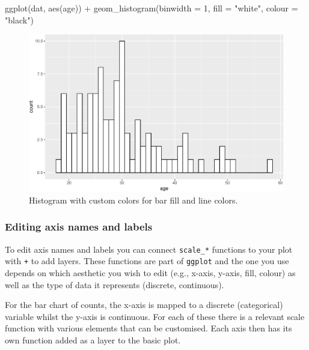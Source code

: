 \documentclass[
  english,
  doc,floatsintext]{apa6}
\newenvironment{Shaded}{\begin{snugshade}}{\end{snugshade}}
\newcommand{\AttributeTok}[1]{\textcolor[rgb]{0.77,0.63,0.00}{#1}}
\newcommand{\DecValTok}[1]{\textcolor[rgb]{0.00,0.00,0.81}{#1}}
\newcommand{\FunctionTok}[1]{\textcolor[rgb]{0.00,0.00,0.00}{#1}}
\newcommand{\NormalTok}[1]{#1}
\newcommand{\SpecialCharTok}[1]{\textcolor[rgb]{0.00,0.00,0.00}{#1}}
\newcommand{\StringTok}[1]{\textcolor[rgb]{0.31,0.60,0.02}{#1}}
\begin{document}
\begin{Shaded}
\begin{Highlighting}[]
\FunctionTok{ggplot}\NormalTok{(dat, }\FunctionTok{aes}\NormalTok{(age)) }\SpecialCharTok{+}
  \FunctionTok{geom\_histogram}\NormalTok{(}\AttributeTok{binwidth =} \DecValTok{1}\NormalTok{, }
                 \AttributeTok{fill =} \StringTok{"white"}\NormalTok{, }
                 \AttributeTok{colour =} \StringTok{"black"}\NormalTok{)}
\end{Highlighting}
\end{Shaded}

\begin{figure}

{\centering \includegraphics[width=1\linewidth]{images/histogram-fill-color-1} 

}

\caption{Histogram with custom colors for bar fill and line colors.}\label{fig:histogram-fill-color}
\end{figure}

\hypertarget{editing-axis-names-and-labels}{%
\subsubsection{Editing axis names and labels}\label{editing-axis-names-and-labels}}

To edit axis names and labels you can connect \texttt{scale\_*} functions to your plot with \texttt{+} to add layers. These functions are part of \texttt{ggplot} and the one you use depends on which aesthetic you wish to edit (e.g., x-axis, y-axis, fill, colour) as well as the type of data it represents (discrete, continuous).

For the bar chart of counts, the x-axis is mapped to a discrete (categorical) variable whilst the y-axis is continuous. For each of these there is a relevant scale function with various elements that can be customised. Each axis then has its own function added as a layer to the basic plot.
\end{document}

